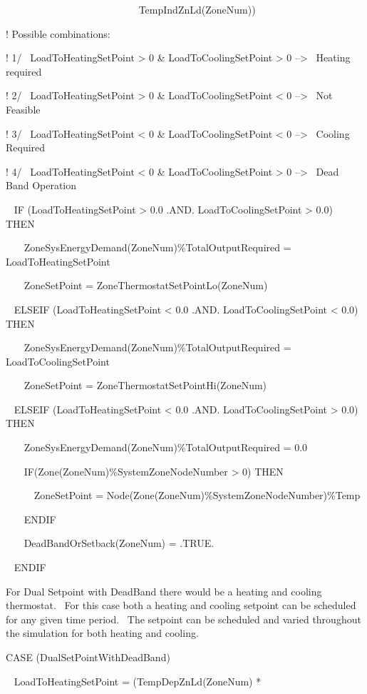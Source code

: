 ~~~~~~~~~~~~~~~~~~~~~~~~~~ TempIndZnLd(ZoneNum))

! Possible combinations:

! 1/~ LoadToHeatingSetPoint \textgreater{} 0 \& LoadToCoolingSetPoint \textgreater{} 0 --\textgreater{}~ Heating required

! 2/~ LoadToHeatingSetPoint \textgreater{} 0 \& LoadToCoolingSetPoint \textless{} 0 --\textgreater{}~ Not Feasible

! 3/~ LoadToHeatingSetPoint \textless{} 0 \& LoadToCoolingSetPoint \textless{} 0 --\textgreater{}~ Cooling Required

! 4/~ LoadToHeatingSetPoint \textless{} 0 \& LoadToCoolingSetPoint \textgreater{} 0 --\textgreater{}~ Dead Band Operation

~ IF (LoadToHeatingSetPoint \textgreater{} 0.0 .AND. LoadToCoolingSetPoint \textgreater{} 0.0) THEN

~~~ ZoneSysEnergyDemand(ZoneNum)\%TotalOutputRequired = LoadToHeatingSetPoint

~~~ ZoneSetPoint = ZoneThermostatSetPointLo(ZoneNum)

~ ELSEIF (LoadToHeatingSetPoint \textless{} 0.0 .AND. LoadToCoolingSetPoint \textless{} 0.0) THEN

~~~ ZoneSysEnergyDemand(ZoneNum)\%TotalOutputRequired = LoadToCoolingSetPoint

~~~ ZoneSetPoint = ZoneThermostatSetPointHi(ZoneNum)

~ ELSEIF (LoadToHeatingSetPoint \textless{} 0.0 .AND. LoadToCoolingSetPoint \textgreater{} 0.0) THEN

~~~ ZoneSysEnergyDemand(ZoneNum)\%TotalOutputRequired = 0.0

~~~ IF(Zone(ZoneNum)\%SystemZoneNodeNumber \textgreater{} 0) THEN

~~~~~ ZoneSetPoint = Node(Zone(ZoneNum)\%SystemZoneNodeNumber)\%Temp

~~~ ENDIF

~~~ DeadBandOrSetback(ZoneNum) = .TRUE.

~ ENDIF

For Dual Setpoint with DeadBand there would be a heating and cooling thermostat.~ For this case both a heating and cooling setpoint can be scheduled for any given time period.~ The setpoint can be scheduled and varied throughout the simulation for both heating and cooling.

CASE (DualSetPointWithDeadBand)

~ LoadToHeatingSetPoint = (TempDepZnLd(ZoneNum) *

